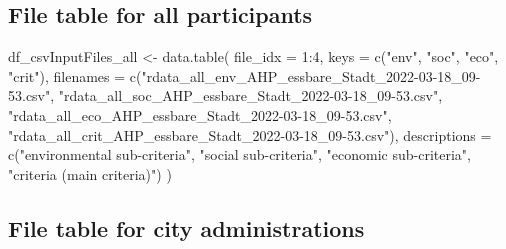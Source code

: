 \documentclass[
]{article}
\newenvironment{Shaded}{\begin{snugshade}}{\end{snugshade}}
\newcommand{\AttributeTok}[1]{\textcolor[rgb]{0.00,0.34,0.68}{#1}}
\newcommand{\DecValTok}[1]{\textcolor[rgb]{0.69,0.50,0.00}{#1}}
\newcommand{\FunctionTok}[1]{\textcolor[rgb]{0.39,0.29,0.61}{#1}}
\newcommand{\NormalTok}[1]{\textcolor[rgb]{0.12,0.11,0.11}{#1}}
\newcommand{\OtherTok}[1]{\textcolor[rgb]{0.00,0.43,0.16}{#1}}
\newcommand{\SpecialCharTok}[1]{\textcolor[rgb]{0.24,0.68,0.91}{#1}}
\newcommand{\StringTok}[1]{\textcolor[rgb]{0.75,0.01,0.01}{#1}}
\begin{document}
\hypertarget{file-table-for-all-participants}{%
\subsection{File table for all
participants}\label{file-table-for-all-participants}}

\begin{Shaded}
\begin{Highlighting}[]
\NormalTok{df\_csvInputFiles\_all }\OtherTok{\textless{}{-}} \FunctionTok{data.table}\NormalTok{(}
  \AttributeTok{file\_idx =} \DecValTok{1}\SpecialCharTok{:}\DecValTok{4}\NormalTok{,}
  \AttributeTok{keys =} \FunctionTok{c}\NormalTok{(}\StringTok{"env"}\NormalTok{, }\StringTok{"soc"}\NormalTok{, }\StringTok{"eco"}\NormalTok{, }\StringTok{"crit"}\NormalTok{),}
  \AttributeTok{filenames =} \FunctionTok{c}\NormalTok{(}\StringTok{"rdata\_all\_env\_AHP\_essbare\_Stadt\_2022{-}03{-}18\_09{-}53.csv"}\NormalTok{,}
                \StringTok{"rdata\_all\_soc\_AHP\_essbare\_Stadt\_2022{-}03{-}18\_09{-}53.csv"}\NormalTok{,}
                \StringTok{"rdata\_all\_eco\_AHP\_essbare\_Stadt\_2022{-}03{-}18\_09{-}53.csv"}\NormalTok{,}
                \StringTok{"rdata\_all\_crit\_AHP\_essbare\_Stadt\_2022{-}03{-}18\_09{-}53.csv"}\NormalTok{),}
  \AttributeTok{descriptions =} \FunctionTok{c}\NormalTok{(}\StringTok{"environmental sub{-}criteria"}\NormalTok{,}
                   \StringTok{"social sub{-}criteria"}\NormalTok{,}
                   \StringTok{"economic sub{-}criteria"}\NormalTok{,}
                   \StringTok{"criteria (main criteria)"}\NormalTok{)}
\NormalTok{)}
\end{Highlighting}
\end{Shaded}

\hypertarget{file-table-for-city-administrations}{%
\subsection{File table for city
administrations}\label{file-table-for-city-administrations}}
\end{document}
